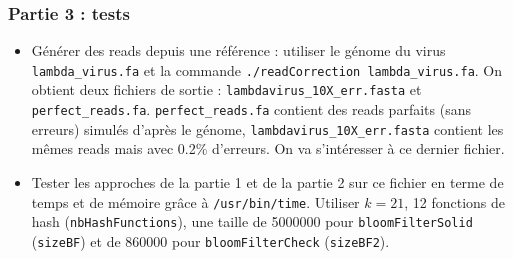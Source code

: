 \documentclass{article}
\begin{document}
 \subsubsection*{Partie 3 : tests}
 \begin{itemize}
  \item Générer des reads depuis une référence : utiliser le génome du virus \texttt{lambda\_virus.fa} et la commande \texttt{./readCorrection lambda\_virus.fa}. On obtient deux fichiers de sortie : \texttt{lambdavirus\_10X\_err.fasta} et \texttt{perfect\_reads.fa}. \texttt{perfect\_reads.fa} contient des reads parfaits (sans erreurs) simulés d'après le génome, \texttt{lambdavirus\_10X\_err.fasta} contient les mêmes reads mais avec 0.2\% d'erreurs. On va s'intéresser à ce dernier fichier.\\
   \noindent{}
   \item Tester les approches de la partie 1 et de la partie 2 sur ce fichier en terme de temps et de mémoire grâce à \texttt{/usr/bin/time}. Utiliser $k=21$, 12 fonctions de hash (\texttt{nbHashFunctions}), une taille de 5000000 pour \texttt{bloomFilterSolid} (\texttt{sizeBF}) et de 860000 pour \texttt{bloomFilterCheck} (\texttt{sizeBF2}).\\
    \noindent{}\\
     \noindent{}
      \noindent{}
 \end{itemize}

 
\end{document}

